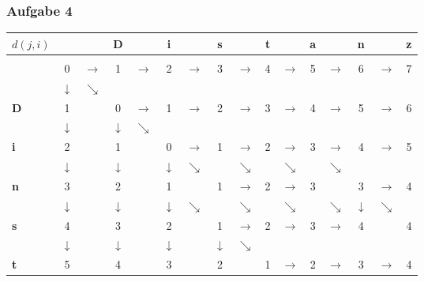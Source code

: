 \documentclass{beamer}
\begin{document}
\begin{frame} \frametitle{Aufgabe 4}
		\centering
		\renewcommand*{\arraystretch}{.7}
		\setlength{\tabcolsep}{3pt}
			\begin{tabular}{l|ccccccccccccccc}
				$d(j,i)$ &       &       & \textbf{D} &       & \textbf{i} &       & \textbf{s} &       & \textbf{t} &       & \textbf{a} &       & \textbf{n} &       & \textbf{z} \\ \hline \\
				& 0     & $\rightarrow$ & 1     & $\rightarrow$ & 2     & $\rightarrow$ & 3     & $\rightarrow$ & 4     & $\rightarrow$ & 5     & $\rightarrow$ & 6     & $\rightarrow$ & 7 \\
				& $\downarrow$ & $\searrow$ &       &       &       &       &       &       &       &       &       &       &       &       &  \\
				\textbf{D}     & 1     &       & 0     & $\rightarrow$ & 1     & $\rightarrow$ & 2     & $\rightarrow$ & 3     & $\rightarrow$ & 4     & $\rightarrow$ & 5     & $\rightarrow$ & 6 \\
				& $\downarrow$ &       & $\downarrow$ & $\searrow$ &       &       &       &       &       &       &       &       &       &       &  \\
				\textbf{i}     & 2     &       & 1     &       & 0     & $\rightarrow$ & 1     & $\rightarrow$ & 2     & $\rightarrow$ & 3     & $\rightarrow$ & 4     & $\rightarrow$ & 5 \\
				& $\downarrow$ &       & $\downarrow$ &       & $\downarrow$ & $\searrow$ &       & $\searrow$ &       & $\searrow$ &       & $\searrow$ &       &       &  \\
				\textbf{n}     & 3     &       & 2     &       & 1     &       & 1     & $\rightarrow$ & 2     & $\rightarrow$ & 3     &       & 3     & $\rightarrow$ & 4 \\
				& $\downarrow$ &       & $\downarrow$ &       & $\downarrow$ & $\searrow$ &       & $\searrow$ &       & $\searrow$ &       & $\searrow$ & $\downarrow$ & $\searrow$ &  \\
				\textbf{s}     & 4     &       & 3     &       & 2     &       & 1     & $\rightarrow$ & 2     & $\rightarrow$ & 3     & $\rightarrow$ & 4     &       & 4 \\
				& $\downarrow$ &       & $\downarrow$ &       & $\downarrow$ &       & $\downarrow$ & $\searrow$ &       &       &       &       &       &       &  \\
				\textbf{t}     & 5     &       & 4     &       & 3     &       & 2     &       & 1     & $\rightarrow$ & 2     & $\rightarrow$ & 3     & $\rightarrow$ & 4 \\

\end{tabular}
\end{frame}
\end{document}
